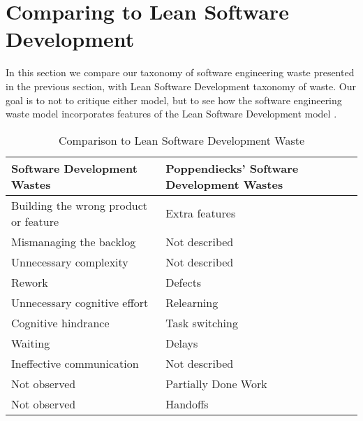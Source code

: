 \section{Comparing to Lean Software Development}
\label{LeanSoftwareDevelopmentComarison}

In this section we compare our taxonomy of software engineering waste presented in the previous section, with Lean Software Development taxonomy of waste. Our goal is to not to critique either model, but to see how the software engineering waste model incorporates features of the Lean Software Development model \cite{PoppendieckConceptToCash}. 

\begin{table}[t]
\renewcommand{\arraystretch}{1.5}
\centering
\caption{Comparison to Lean Software Development Waste}
\label{LeanSoftwareDevelopmentComparison}
\begin{tabular}{|p{1.57in}|p{1.57in}|}
\hline
Software Development Wastes           & Poppendiecks' Software Development Wastes \\ \hline
Building the wrong product or feature & Extra features                            \\ \hline
Mismanaging the backlog               & Not described                             \\ \hline
Unnecessary complexity                & Not described                             \\ \hline
Rework                                & Defects                                   \\ \hline
Unnecessary cognitive effort          & Relearning                             \\ \hline
Cognitive hindrance           & Task switching                             \\ \hline
Waiting                               & Delays                                    \\ \hline
Ineffective communication             & Not described                             \\ \hline
Not observed                          & Partially Done Work                       \\ \hline
Not observed                          & Handoffs                                  \\ \hline
\end{tabular}
\end{table}
